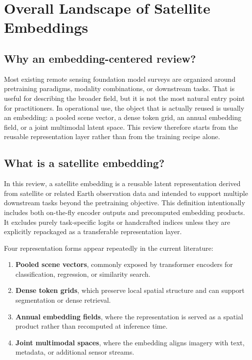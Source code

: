 \section{Overall Landscape of Satellite Embeddings}

\subsection{Why an embedding-centered review?}

Most existing remote sensing foundation model surveys are organized around pretraining paradigms, modality combinations, or downstream tasks. That is useful for describing the broader field, but it is not the most natural entry point for practitioners. In operational use, the object that is actually reused is usually an embedding: a pooled scene vector, a dense token grid, an annual embedding field, or a joint multimodal latent space. This review therefore starts from the reusable representation layer rather than from the training recipe alone.

\subsection{What is a satellite embedding?}

In this review, a satellite embedding is a reusable latent representation derived from satellite or related Earth observation data and intended to support multiple downstream tasks beyond the pretraining objective. This definition intentionally includes both on-the-fly encoder outputs and precomputed embedding products. It excludes purely task-specific logits or handcrafted indices unless they are explicitly repackaged as a transferable representation layer.

Four representation forms appear repeatedly in the current literature:

\begin{enumerate}[leftmargin=1.4em]
  \item \textbf{Pooled scene vectors}, commonly exposed by transformer encoders for classification, regression, or similarity search.
  \item \textbf{Dense token grids}, which preserve local spatial structure and can support segmentation or dense retrieval.
  \item \textbf{Annual embedding fields}, where the representation is served as a spatial product rather than recomputed at inference time.
  \item \textbf{Joint multimodal spaces}, where the embedding aligns imagery with text, metadata, or additional sensor streams.
\end{enumerate}


